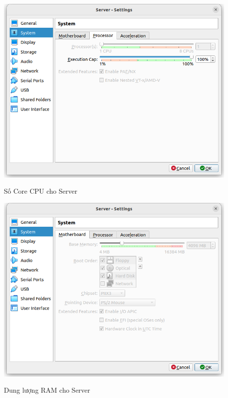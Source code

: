 \documentclass[a4paper, 11pt]{article}
\begin{document}
\begin{itemize}
\begin{enumerate}
                    \begin{minipage}
                        {\linewidth}
                        \captionsetup{type=figure}
                        \centering
                        \includegraphics[width=12cm]{images/server-processor.png}
                        \caption{Số Core CPU cho Server}
                        \label{server-processor}
                    \end{minipage}

                    \begin{minipage}{\linewidth}
                        \captionsetup{type=figure}
                        \centering
                        \includegraphics[width=12cm]{images/server-ram.png}
                        \caption{Dung lượng RAM cho Server}
                        \label{server-ram}
                    \end{minipage}


\end{enumerate}
\end{itemize}
\end{document}
